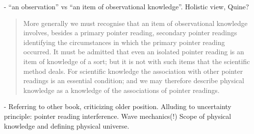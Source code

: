 - ``an observation'' vs ``an item of observational knowledge''.  Holistic view, Quine?

\begin{quote}
    More generally we must recognise that an item of observational knowledge involves, besides a primary pointer reading, secondary pointer readings identifying the circumstances in which the primary pointer reading occurred.  It must be admitted that even an isolated pointer reading is an item of knowledge of a sort; but it is not with such items that the scientific method deals.  For scientific knowledge the association with other pointer readings is an essential condition; and we may therefore describe physical knowledge as a knowledge of the associations of pointer readings.  \citep[p. 100]{Eddington1939}
\end{quote}

- Referring to other book, criticizing older position.  Alluding to uncertainty principle: pointer reading interference.  Wave mechanics(!)  Scope of physical knowledge and defining physical universe.


